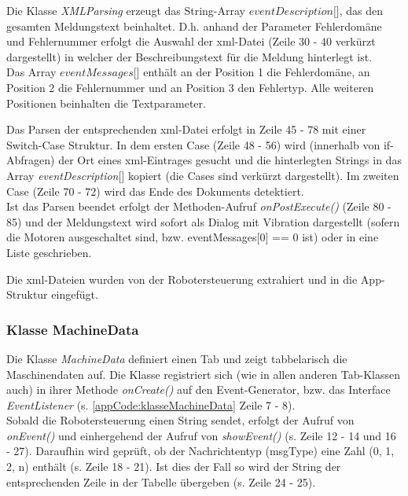 Die Klasse \textit{XMLParsing} erzeugt das String-Array 
$\textit{eventDescription[]}$, das den gesamten Meldungstext 
beinhaltet. D.h. anhand der Parameter Fehlerdomäne und Fehlernummer erfolgt die 
Auswahl der xml-Datei (Zeile 30 - 40 verkürzt dargestellt) in welcher der 
Beschreibungstext für die Meldung hinterlegt ist.\\
Das Array $\textit{eventMessages[]}$ enthält an der Position 1 die 
Fehlerdomäne, an Position 2 die Fehlernummer und an Position 3 den Fehlertyp. 
Alle weiteren Positionen beinhalten die Textparameter.

Das Parsen der entsprechenden xml-Datei erfolgt in Zeile 45 - 78 mit einer 
Switch-Case Struktur. In dem ersten Case (Zeile 48 - 56) wird (innerhalb von 
if-Abfragen) der Ort eines xml-Eintrages gesucht und die hinterlegten Strings 
in das Array \textit{eventDescription$[$$]$} kopiert (die Cases sind verkürzt 
dargestellt). Im zweiten Case (Zeile 70 - 72) wird das Ende des Dokuments 
detektiert.\\
Ist das Parsen beendet erfolgt der Methoden-Aufruf \textit{onPostExecute()} 
(Zeile 80 - 85) und der Meldungstext wird sofort als Dialog mit Vibration 
dargestellt (sofern die Motoren ausgeschaltet sind, bzw. eventMessages$[$0$]$ 
== 0 ist) oder in eine Liste geschrieben.

Die xml-Dateien wurden von der Robotersteuerung extrahiert und in die 
App-Struktur eingefügt.



\subsubsection{Klasse MachineData}
Die Klasse \textit{MachineData} definiert einen Tab und zeigt tabbelarisch die 
Maschinendaten auf. Die Klasse registriert sich (wie in allen anderen 
Tab-Klassen auch) in ihrer 
Methode \textit{onCreate()} auf den Event-Generator, bzw. das Interface 
\textit{EventListener} (s. \ref{appCode:klasseMachineData} Zeile 7 - 8).\\
Sobald die Robotersteuerung einen String sendet, erfolgt der Aufruf von 
\textit{onEvent()} und einhergehend der Aufruf von \textit{showEvent()} (s. 
Zeile 12 - 14 und 16 - 27). Daraufhin wird geprüft, ob der Nachrichtentyp 
(msgType) eine Zahl (0, 1, 2, n) enthält (s. Zeile 18 - 21). Ist dies der 
Fall so wird der 
String der entsprechenden Zeile in der Tabelle übergeben (s. Zeile 24 - 25).



